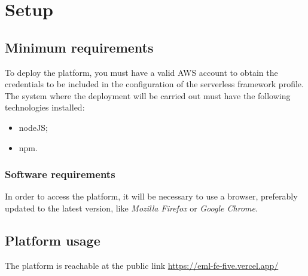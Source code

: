 \section{Setup}
\subsection{Minimum requirements}
To deploy the platform, you must have a valid AWS account to obtain the credentials to be included in the configuration of the serverless framework profile.\newline
The system where the deployment will be carried out must have the following technologies installed:
\begin{itemize}
    \item nodeJS;
    \item npm.
\end{itemize}
\subsubsection{Software requirements}
In order to access the platform, it will be necessary to use a browser, preferably updated to the latest version, like \textit{Mozilla Firefox} or \textit{Google Chrome}.
\subsection{Platform usage}
The platform is reachable at the public link \href{https://eml-fe-five.vercel.app/}{https://eml-fe-five.vercel.app/}